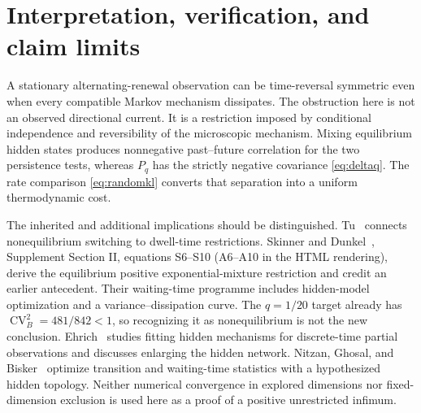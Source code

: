 \documentclass[11pt,a4paper]{article}
\begin{document}
\section{Interpretation, verification, and claim limits}
A stationary alternating-renewal observation can be time-reversal symmetric even when every compatible Markov mechanism dissipates. The obstruction here is not an observed directional current. It is a restriction imposed by conditional independence and reversibility of the microscopic mechanism. Mixing equilibrium hidden states produces nonnegative past--future correlation for the two persistence tests, whereas $P_q$ has the strictly negative covariance \eqref{eq:deltaq}. The rate comparison \eqref{eq:randomkl} converts that separation into a uniform thermodynamic cost.

The inherited and additional implications should be distinguished. Tu~\cite{tu} connects nonequilibrium switching to dwell-time restrictions. Skinner and Dunkel~\cite{skinner}, Supplement Section II, equations S6--S10 (A6--A10 in the HTML rendering), derive the equilibrium positive exponential-mixture restriction and credit an earlier antecedent. Their waiting-time programme includes hidden-model optimization and a variance--dissipation curve. The $q=1/20$ target already has $\operatorname{CV}_B^2=481/842<1$, so recognizing it as nonequilibrium is not the new conclusion. Ehrich~\cite{ehrich} studies fitting hidden mechanisms for discrete-time partial observations and discusses enlarging the hidden network. Nitzan, Ghosal, and Bisker~\cite{nitzan} optimize transition and waiting-time statistics with a hypothesized hidden topology. Neither numerical convergence in explored dimensions nor fixed-dimension exclusion is used here as a proof of a positive unrestricted infimum.
\end{document}
